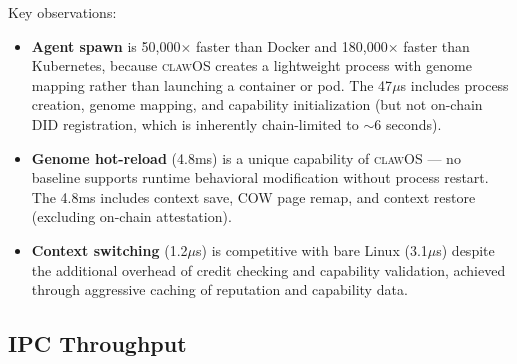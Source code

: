 \documentclass{article}
\newcommand{\clawos}{\textsc{clawOS}}
\begin{document}
Key observations:

\begin{itemize}[leftmargin=*]
    \item \textbf{Agent spawn} is 50,000$\times$ faster than Docker and 180,000$\times$ faster than Kubernetes, because \clawos{} creates a lightweight process with genome mapping rather than launching a container or pod. The 47$\mu$s includes process creation, genome mapping, and capability initialization (but not on-chain DID registration, which is inherently chain-limited to $\sim$6 seconds).
    
    \item \textbf{Genome hot-reload} (4.8ms) is a unique capability of \clawos{} — no baseline supports runtime behavioral modification without process restart. The 4.8ms includes context save, COW page remap, and context restore (excluding on-chain attestation).
    
    \item \textbf{Context switching} (1.2$\mu$s) is competitive with bare Linux (3.1$\mu$s) despite the additional overhead of credit checking and capability validation, achieved through aggressive caching of reputation and capability data.
\end{itemize}

\subsection{IPC Throughput}
\end{document}
